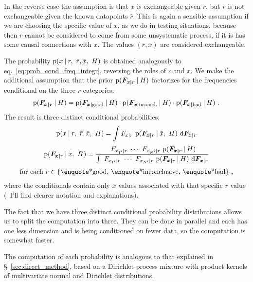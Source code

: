 \documentclass[\ifafour a4paper,12pt,\else a5paper,10pt,\fi%
onecolumn,oneside,article,%
british%
]{memoir}
\theoremstyle{remark}
\theoremstyle{innote}
\newcommand*{\di}{\mathrm{d}}%
\DeclarePairedDelimiter\set{\{}{\}}
\newcommand*{\p}{\mathrm{p}}%
\renewcommand*{\|}[1][]{\nonscript\:#1\vert\nonscript\:\mathopen{}}
\renewcommand*{\=}{\TextOrMath\texteq\eq}
\newcommand*{\sect}{\S}%
\newcommand*{\eqn}{eq.}%
\newcommand*{\wrench}{{\fontencoding{U}\fontfamily{fontawesomethree}\selectfont\symbol{114}}}
\newcommand{\mynote}[1]{ {\color{notecolour}#1}}
\newcommand*{\ro}{r}
\newcommand*{\xo}{x}
\newcommand*{\rd}{\bar{r}}
\newcommand*{\xd}{\bar{x}}
\newcommand*{\yF}{\bm{F}}
\newcommand*{\yFxr}{\yF_{\bm{x\mid r}}}
\begin{document}
In the reverse case the assumption is that $\xo$ is exchangeable given
$\ro$, but $\ro$ is not exchangeable given the known datapoints $\rd$.
This is again a sensible assumption if we are choosing the specific value
of $\xo$, as we do in testing situations, because then $\ro$ cannot be
considered to come from some unsystematic process, if it is has some causal
connections with $\xo$. The values $(\rd,\xd)$ are considered
exchangeable.

The probability $\p(\xo \| \ro,\ \rd,\xd,\ H)$ is obtained analogously
to \eqn~\eqref{eq:prob_cond_freq_integr}, reversing the roles of $r$ and
$x$. We make the additional assumption that the prior
$\p(\yFxr \| H)$ factorizes for the frequencies conditional on the three
$r$ categories:
\begin{equation}
  \label{eq:factor_prior_cond}
  \p(\yFxr \| H) =
  \p(\yF_{\bm{x \mid} \text{good}} \| H)\cdot
  \p(\yF_{\bm{x \mid} \text{inconcl.}} \| H)\cdot 
  \p(\yF_{\bm{x \mid} \text{bad}} \| H)\ .
\end{equation}
The result is three distinct conditional probabilities:
\begin{equation}
  \label{eq:reverse_case_main}
  \begin{gathered}
  \p(\xo \| r,\ \rd,\xd,\ H) =
\int F_{\xo\|r} \ \p(\yF_{\bm{x\mid}r} \| \xd,\ H)\ \di\yF_{\bm{x\mid}r}
  \\[\jot]
  \p(\yF_{\bm{x\mid}r} \| \xd,\ H) =
  \frac{
    \ F_{x_{1'}\| r} \  \dotsm \ 
  F_{x_{N'}\| r} \ \p(\yF_{\bm{x\mid}r}  \| H)
  }{
    \int
    \ F_{x_{1'}\| r} \  \dotsm \ 
  F_{x_{N'}\| r} \ \p(\yF_{\bm{x\mid}r}  \| H)\ \di\yF_{\bm{x\mid}r} 
}\\[\jot]
  \text{for each } r \in
  \set{\text{\enquote*{good}},\, \text{\enquote*{inconclusive}},\,
    \text{\enquote*{bad}}}\ ,
\end{gathered}
\end{equation}
where the conditionals contain only $\xd$ values associated with that
specific $r$ value \mynote{(\wrench\ I'll find clearer notation and
  explanations)}.

The fact that we have three distinct conditional probability distributions
allows us to split the computation into three. They can be done in parallel
and each has one less dimension and is being conditioned on fewer data, so
the computation is somewhat faster.

The computation of each probability is analogous to that explained in
\sect~\ref{sec:direct_method}, based on a Dirichlet-process mixture with
product kernels of multivariate normal and Dirichlet distributions. 
\end{document}
